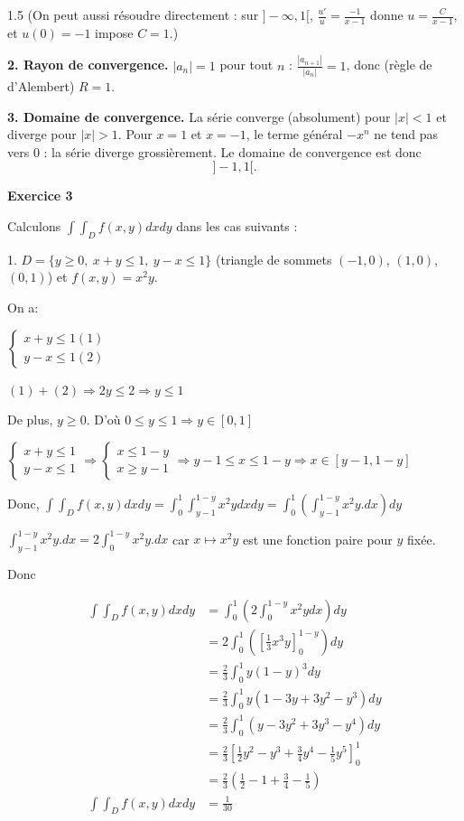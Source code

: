 \documentclass[12pt]{article}
\begin{document}
\begin{spacing}{1.5}
(On peut aussi résoudre directement : sur $]-\infty,1[$, $\frac{u'}{u}=\frac{-1}{x-1}$ donne $u=\frac{C}{x-1}$, et $u(0)=-1$ impose $C=1$.)

\textbf{2. Rayon de convergence.} $|a_n|=1$ pour tout $n$ : $\frac{|a_{n+1}|}{|a_n|}=1$, donc (règle de d'Alembert) $\boxed{R=1}$.

\textbf{3. Domaine de convergence.} La série converge (absolument) pour $|x|<1$ et diverge pour $|x|>1$. Pour $x=1$ et $x=-1$, le terme général $-x^n$ ne tend pas vers $0$ : la série diverge grossièrement. Le domaine de convergence est donc
\[
\boxed{]-1,1[}.
\]

\medskip
\textbf{Exercice 3}

Calculons $\int\int_{D}f(x,y)dxdy$ dans les cas suivants :

1. $D= \lbrace {y\geq 0,\ x+y\leq 1,\ y-x\leq 1\rbrace}$ (triangle de sommets $(-1,0)$, $(1,0)$, $(0,1)$) et $f(x,y)=x^{2}y$.


On a:

$
\begin{cases}
x+y\leq 1 (1)\\
y-x \leq 1 (2)
\end{cases}$

$(1)+(2)\Longrightarrow 2y\leq 2 \Longrightarrow y\leq 1$

De plus, $y\geq 0$. 	D'où $0\leq y\leq 1\Rightarrow y\in [0,1]$

$
\begin{cases}
x+y\leq 1 \\
y-x \leq 1 
\end{cases}\Rightarrow 
\begin{cases}
x\leq 1-y \\
x \geq y-1
\end{cases}\Longrightarrow  y-1\leq x \leq 1-y \Rightarrow x\in [y-1,1-y]$

Donc,
$
\int\int_{D}f(x,y)dxdy=\int_0^1\int_{y-1}^{1-y}x^2ydxdy=\int_0^1(\int_{y-1}^{1-y}x^2y.dx)dy
$

$\int_{y-1}^{1-y}x^2y.dx=2\int_{0}^{1-y}x^2y.dx$ car $x\mapsto x^2y$ est une fonction paire pour $y$ fixée.

Donc

\begin{align*}
\int\int_{D}f(x,y)dxdy &=\int_0^1(2\int_{0}^{1-y}x^2ydx)dy\\
&=2\int_0^1([\frac{1}{3}x^3y]_0^{1-y})dy\\
&=\frac{2}{3}\int_0^1y(1-y)^3dy\\
&=\frac{2}{3}\int_0^1y(1-3y+3y^2-y^3)dy\\
&=\frac{2}{3}\int_0^1(y-3y^2+3y^3-y^4)dy\\
&=\frac{2}{3}[\frac{1}{2}y^2-y^3+\frac{3}{4}y^4-\frac{1}{5}y^5]_0^1\\
&=\frac{2}{3}(\frac{1}{2}-1+\frac{3}{4}-\frac{1}{5})\\
\int\int_{D}f(x,y)dxdy &=\frac{1}{30}
\end{align*}


\end{spacing}
\end{document}
